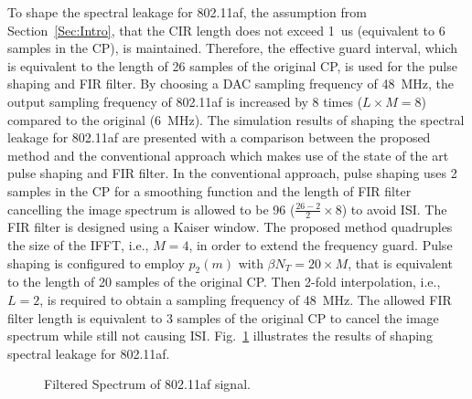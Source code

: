 To shape the spectral leakage for 802.11af, the assumption from Section~\ref{Sec:Intro}, that the CIR length does not exceed 1~us (equivalent to 6 samples in the CP), is maintained.
Therefore, the effective guard interval, which is equivalent to the length of 26 samples of the original CP, is used for the pulse shaping and FIR filter.
By choosing a DAC sampling frequency of 48~MHz, the output sampling frequency of 802.11af is increased by 8 times ($L\times M =8$) compared to the original (6~MHz).
The simulation results of shaping the spectral leakage for 802.11af are presented with a comparison between the proposed method and the conventional approach which makes use of the state of the art pulse shaping and FIR filter.
In the conventional approach, pulse shaping uses 2 samples in the CP for a smoothing function and the length of FIR filter cancelling the image spectrum is allowed to be 96 ($\frac{26-2}{2} \times 8$) to avoid ISI. 
The FIR filter is designed using a Kaiser window. %
The proposed method quadruples the size of the IFFT, i.e., $M=4$, in order to extend the frequency guard. 
Pulse shaping is configured to employ $p_2(m)$ with $\beta N_{T}=20 \times M$, that is equivalent to the length of 20 samples of the original CP.
Then 2-fold interpolation, i.e., $L=2$, is required to obtain a sampling frequency of 48~MHz. 
The allowed FIR filter length is equivalent to 3 samples of the original CP to cancel the image spectrum while still not causing ISI.
Fig.~\ref{fig:80211af} illustrates the results of shaping spectral leakage for 802.11af.

\begin{figure}
	\centering
	\vspace{-2mm}
\caption{Filtered Spectrum of 802.11af signal.}
\label{fig:80211af}
\end{figure}

